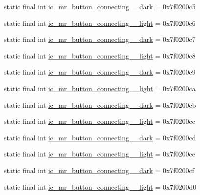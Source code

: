 \begin{CompactItemize}
\item 
static final int \hyperlink{classandroid_1_1support_1_1v7_1_1cardview_1_1_r_1_1drawable_0af39ec86aa7daffce7bf430ebc10b26}{ic\_\-mr\_\-button\_\-connecting\_\_\-dark} = 0x7f0200c5
\item 
static final int \hyperlink{classandroid_1_1support_1_1v7_1_1cardview_1_1_r_1_1drawable_459c9f79e3d0aeff422ee1d034ed144c}{ic\_\-mr\_\-button\_\-connecting\_\_\-light} = 0x7f0200c6
\item 
static final int \hyperlink{classandroid_1_1support_1_1v7_1_1cardview_1_1_r_1_1drawable_77e8d9a972cc696863cb92f2ad8b4aed}{ic\_\-mr\_\-button\_\-connecting\_\_\-dark} = 0x7f0200c7
\item 
static final int \hyperlink{classandroid_1_1support_1_1v7_1_1cardview_1_1_r_1_1drawable_3ac81f6706ae1d1e173ce94a18da1568}{ic\_\-mr\_\-button\_\-connecting\_\_\-light} = 0x7f0200c8
\item 
static final int \hyperlink{classandroid_1_1support_1_1v7_1_1cardview_1_1_r_1_1drawable_5caa3c83152b3ad4baecf354e22236dd}{ic\_\-mr\_\-button\_\-connecting\_\_\-dark} = 0x7f0200c9
\item 
static final int \hyperlink{classandroid_1_1support_1_1v7_1_1cardview_1_1_r_1_1drawable_4a14698f39c58a70b9bb4afdc521c578}{ic\_\-mr\_\-button\_\-connecting\_\_\-light} = 0x7f0200ca
\item 
static final int \hyperlink{classandroid_1_1support_1_1v7_1_1cardview_1_1_r_1_1drawable_e4fc54bc539e9ea28f6ee4240afdb1c8}{ic\_\-mr\_\-button\_\-connecting\_\_\-dark} = 0x7f0200cb
\item 
static final int \hyperlink{classandroid_1_1support_1_1v7_1_1cardview_1_1_r_1_1drawable_936dffe6c26a826cad488de90ffae1ee}{ic\_\-mr\_\-button\_\-connecting\_\_\-light} = 0x7f0200cc
\item 
static final int \hyperlink{classandroid_1_1support_1_1v7_1_1cardview_1_1_r_1_1drawable_7d87793737e93d0fdacf5c8148ab33fd}{ic\_\-mr\_\-button\_\-connecting\_\_\-dark} = 0x7f0200cd
\item 
static final int \hyperlink{classandroid_1_1support_1_1v7_1_1cardview_1_1_r_1_1drawable_ff29cf4509b703410abd82de04c66f27}{ic\_\-mr\_\-button\_\-connecting\_\_\-light} = 0x7f0200ce
\item 
static final int \hyperlink{classandroid_1_1support_1_1v7_1_1cardview_1_1_r_1_1drawable_b5d3c6452bb5febf08c7959469183c04}{ic\_\-mr\_\-button\_\-connecting\_\_\-dark} = 0x7f0200cf
\item 
static final int \hyperlink{classandroid_1_1support_1_1v7_1_1cardview_1_1_r_1_1drawable_ba45c0a1adbebb3cda701a5fb71867b4}{ic\_\-mr\_\-button\_\-connecting\_\_\-light} = 0x7f0200d0

\end{CompactItemize}
